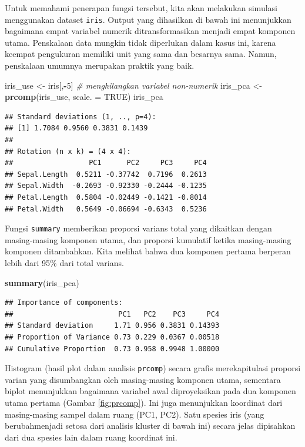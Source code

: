 \documentclass[]{book}
\newenvironment{Shaded}{\begin{snugshade}}{\end{snugshade}}
\newcommand{\CommentTok}[1]{\textcolor[rgb]{0.56,0.35,0.01}{\textit{#1}}}
\newcommand{\DataTypeTok}[1]{\textcolor[rgb]{0.13,0.29,0.53}{#1}}
\newcommand{\DecValTok}[1]{\textcolor[rgb]{0.00,0.00,0.81}{#1}}
\newcommand{\KeywordTok}[1]{\textcolor[rgb]{0.13,0.29,0.53}{\textbf{#1}}}
\newcommand{\NormalTok}[1]{#1}
\newcommand{\OperatorTok}[1]{\textcolor[rgb]{0.81,0.36,0.00}{\textbf{#1}}}
\newcommand{\OtherTok}[1]{\textcolor[rgb]{0.56,0.35,0.01}{#1}}
\newcommand{\StringTok}[1]{\textcolor[rgb]{0.31,0.60,0.02}{#1}}
\theoremstyle{definition}
\theoremstyle{definition}
\theoremstyle{definition}
\theoremstyle{remark}
\begin{document}
Untuk memahami penerapan fungsi tersebut, kita akan melakukan simulasi menggunakan dataset \texttt{iris}. Output yang dihasilkan di bawah ini menunjukkan bagaimana empat variabel numerik ditransformasikan menjadi empat komponen utama. Penskalaan data mungkin tidak diperlukan dalam kasus ini, karena keempat pengukuran memiliki unit yang sama dan besarnya sama. Namun, penskalaan umumnya merupakan praktik yang baik.

\begin{Shaded}
\begin{Highlighting}[]
\NormalTok{iris_use <-}\StringTok{ }\NormalTok{iris[,}\OperatorTok{-}\DecValTok{5}\NormalTok{] }\CommentTok{# menghilangkan variabel non-numerik}
\NormalTok{iris_pca <-}\StringTok{ }\KeywordTok{prcomp}\NormalTok{(iris_use, }\DataTypeTok{scale. =} \OtherTok{TRUE}\NormalTok{)}
\NormalTok{iris_pca}
\end{Highlighting}
\end{Shaded}

\begin{verbatim}
## Standard deviations (1, .., p=4):
## [1] 1.7084 0.9560 0.3831 0.1439
## 
## Rotation (n x k) = (4 x 4):
##                  PC1      PC2     PC3     PC4
## Sepal.Length  0.5211 -0.37742  0.7196  0.2613
## Sepal.Width  -0.2693 -0.92330 -0.2444 -0.1235
## Petal.Length  0.5804 -0.02449 -0.1421 -0.8014
## Petal.Width   0.5649 -0.06694 -0.6343  0.5236
\end{verbatim}

Fungsi \texttt{summary} memberikan proporsi varians total yang dikaitkan dengan masing-masing komponen utama, dan proporsi kumulatif ketika masing-masing komponen ditambahkan. Kita melihat bahwa dua komponen pertama berperan lebih dari 95\% dari total varians.

\begin{Shaded}
\begin{Highlighting}[]
\KeywordTok{summary}\NormalTok{(iris_pca)}
\end{Highlighting}
\end{Shaded}

\begin{verbatim}
## Importance of components:
##                         PC1   PC2    PC3     PC4
## Standard deviation     1.71 0.956 0.3831 0.14393
## Proportion of Variance 0.73 0.229 0.0367 0.00518
## Cumulative Proportion  0.73 0.958 0.9948 1.00000
\end{verbatim}

Histogram (hasil plot dalam analisis \texttt{prcomp}) secara grafis merekapitulasi proporsi varian yang disumbangkan oleh masing-masing komponen utama, sementara biplot menunjukkan bagaimana variabel awal diproyeksikan pada dua komponen utama pertama (Gambar \ref{fig:prcomp}). Ini juga menunjukkan koordinat dari masing-masing sampel dalam ruang (PC1, PC2). Satu spesies iris (yang berubahmenjadi setosa dari analisis kluster di bawah ini) secara jelas dipisahkan dari dua spesies lain dalam ruang koordinat ini.
\end{document}
